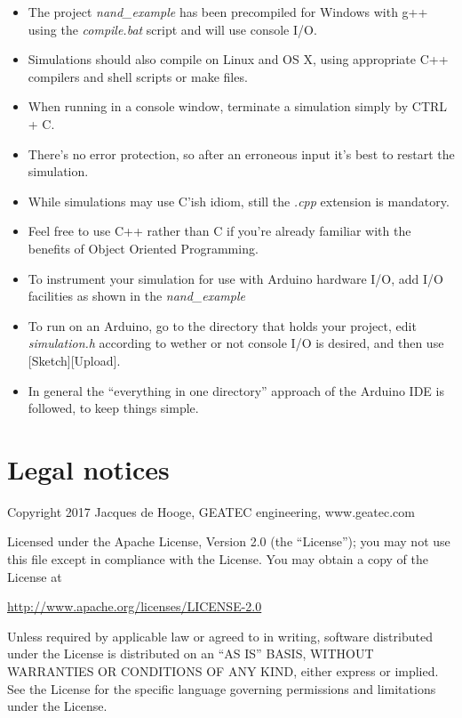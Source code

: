 \documentclass[a4paper,11pt]{article}
\begin{document}
\begin{itemize}
\item{The project \emph{nand\_example} has been precompiled for Windows with g++ using the \emph{compile.bat} script and will use console I/O.}
\item{Simulations should also compile on Linux and OS X, using appropriate C++ compilers and shell scripts or make files.}
\item{When running in a console window, terminate a simulation simply by CTRL + C.}
\item{There's no error protection, so after an erroneous input it's best to restart the simulation.}
\item{While simulations may use C'ish idiom, still the \emph{.cpp} extension is mandatory.}
\item{Feel free to use C++ rather than C if you're already familiar with the benefits of Object Oriented Programming.}
\item{To instrument your simulation for use with Arduino hardware I/O, add I/O facilities as shown in the \emph{nand\_example}}
\item{To run on an Arduino, go to the directory that holds your project, edit \emph{simulation.h} according to wether or not console I/O is desired, and then use [Sketch][Upload].}
\item{In general the ``everything in one directory'' approach of the Arduino IDE is followed, to keep things simple.}
\end{itemize}

\section{Legal notices}

Copyright 2017 Jacques de Hooge, GEATEC engineering, www.geatec.com

Licensed under the Apache License, Version 2.0 (the ``License'');
you may not use this file except in compliance with the License.
You may obtain a copy of the License at

\url{http://www.apache.org/licenses/LICENSE-2.0}

Unless required by applicable law or agreed to in writing, software
distributed under the License is distributed on an ``AS IS'' BASIS,
WITHOUT WARRANTIES OR CONDITIONS OF ANY KIND, either express or implied.
See the License for the specific language governing permissions and
limitations under the License.
\end{document}
